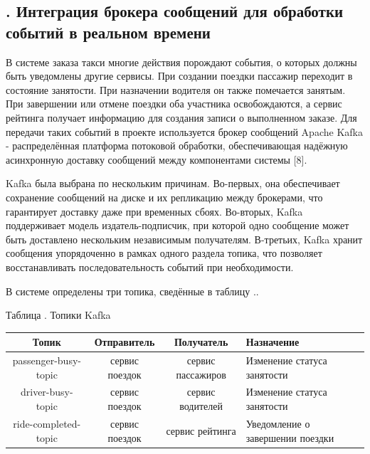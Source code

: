 \subtitlespace

\subsection*{
  \gostTitleFont
  \redline
  \thechaptercntr .\thesubchaptercntr \spc
  Интеграция брокера сообщений для обработки событий в реальном времени
} \addtocounter{subchaptercntr}{1}

\subtitlespace

{\gostFont

  \par \redline В системе заказа такси многие действия порождают события, о которых должны быть уведомлены другие сервисы. При создании поездки пассажир переходит в состояние занятости. При назначении водителя он также помечается занятым. При завершении или отмене поездки оба участника освобождаются, а сервис рейтинга получает информацию для создания записи о выполненном заказе. Для передачи таких событий в проекте используется брокер сообщений Apache Kafka - распределённая платформа потоковой обработки, обеспечивающая надёжную асинхронную доставку сообщений между компонентами системы [8].

  \par \redline Kafka была выбрана по нескольким причинам. Во-первых, она обеспечивает сохранение сообщений на диске и их репликацию между брокерами, что гарантирует доставку даже при временных сбоях. Во-вторых, Kafka поддерживает модель издатель-подписчик, при которой одно сообщение может быть доставлено нескольким независимым получателям. В-третьих, Kafka хранит сообщения упорядоченно в рамках одного раздела топика, что позволяет восстанавливать последовательность событий при необходимости.

  \par \redline В системе определены три топика, сведённые в таблицу \thechaptercntr .\thetablecntr .
  \topTablespace
  {\begin{Center}
      \par Таблица \thechaptercntr .\thetablecntr \spc {--} Топики Kafka

      \begin{tabular}{|c|c|c|p{4cm}|}
        \hline
        Топик & Отправитель & Получатель & Назначение \\ \hline
        passenger-busy-topic & сервис поездок & сервис пассажиров & Изменение статуса занятости \\ \hline
        driver-busy-topic & сервис поездок & сервис водителей & Изменение статуса занятости \\ \hline
        ride-completed-topic & сервис поездок & сервис рейтинга & Уведомление о завершении поездки \\ \hline
    \end{tabular} \end{Center}}
  \botTablespace \addtocounter{tablecntr}{1}

}

